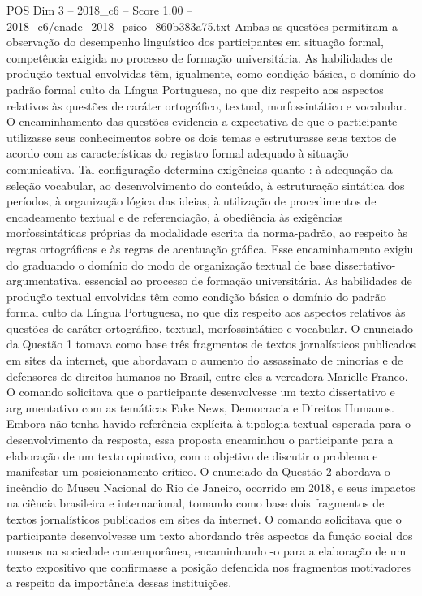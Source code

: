 \begin{textsample}{POS Dim 3 – 2018\_c6 – Score 1.00 – 2018\_c6/enade\_2018\_psico\_860b383a75.txt}
Ambas as questões permitiram a observação do desempenho linguístico dos participantes em situação formal, competência exigida no processo de formação universitária.
As habilidades de produção textual envolvidas têm, igualmente, como condição básica, o domínio do padrão formal culto da Língua Portuguesa, no que diz respeito aos aspectos relativos às questões de caráter ortográfico, textual, morfossintático e vocabular.
O encaminhamento das questões evidencia a expectativa de que o participante utilizasse seus conhecimentos sobre os dois temas e estruturasse seus textos de acordo com as características do registro formal adequado à situação comunicativa.
Tal configuração determina exigências quanto : à adequação da seleção vocabular, ao desenvolvimento do conteúdo, à estruturação sintática dos períodos, à organização lógica das ideias, à utilização de procedimentos de encadeamento textual e de referenciação, à obediência às exigências morfossintáticas próprias da modalidade escrita da norma-padrão, ao respeito às regras ortográficas e às regras de acentuação gráfica.
Esse encaminhamento exigiu do graduando o domínio do modo de organização textual de base dissertativo-argumentativa, essencial ao processo de formação universitária.
As habilidades de produção textual envolvidas têm como condição básica o domínio do padrão formal culto da Língua Portuguesa, no que diz respeito aos aspectos relativos às questões de caráter ortográfico, textual, morfossintático e vocabular.
O enunciado da Questão 1 tomava como base três fragmentos de textos jornalísticos publicados em sites da internet, que abordavam o aumento do assassinato de minorias e de defensores de direitos humanos no Brasil, entre eles a vereadora Marielle Franco.
O comando solicitava que o participante desenvolvesse um texto dissertativo e argumentativo com as temáticas Fake News, Democracia e Direitos Humanos.
Embora não tenha havido referência explícita à tipologia textual esperada para o desenvolvimento da resposta, essa proposta encaminhou o participante para a elaboração de um texto opinativo, com o objetivo de discutir o problema e manifestar um posicionamento crítico.
O enunciado da Questão 2 abordava o incêndio do Museu Nacional do Rio de Janeiro, ocorrido em 2018, e seus impactos na ciência brasileira e internacional, tomando como base dois fragmentos de textos jornalísticos publicados em sites da internet.
O comando solicitava que o participante desenvolvesse um texto abordando três aspectos da função social dos museus na sociedade contemporânea, encaminhando -o para a elaboração de um texto expositivo que confirmasse a posição defendida nos fragmentos motivadores a respeito da importância dessas instituições.

\end{textsample}
